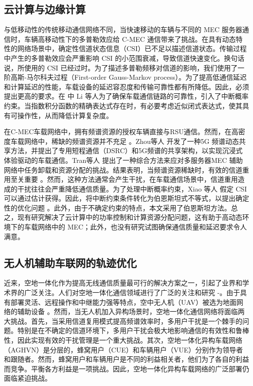\subsection{云计算与边缘计算}\label{section1-2-2}
与低移动性的传统移动通信网络不同，当快速移动的车辆与不同的 MEC 服务器通信时，车辆高移动性下的多普勒效应给 C-MEC 通信带来了挑战。在具有动态特性的网络场景中，确定性信道状态信息（CSI）已不足以描述信道状态。传输过程中产生的多普勒效应会严重影响 CSI 的小范围衰减，导致信道快速变化。换句话说，所使用的 CSI 已经过时。为了描述多普勒频移对信道的影响，我们使用了一阶高斯-马尔科夫过程（First-order Gauss-Markov process）\cite{CCO}。为了提高低通信延迟和计算延迟的性能，车载设备的延迟容忍度和传输可靠性都有所降低。因此，必须提出更高的要求。在 \cite{Li2020} 中 Li 等人为了确保车载通信链路的可靠性，引入了中断概率约束。当指数积分函数的精确表达式存在时，有必要考虑近似闭式表达式，使其具有可操作性，从而降低计算复杂度。

在C-MEC车载网络中，拥有频谱资源的授权车辆直接与RSU通信。然而，在高密度车载网络中，稀缺的频谱资源并不充足 \cite{Xie2020}。Zhou等人 \cite{Zhou2017} 开发了一种5G 频谱动态共享方法，并提出了专用短程通信（DSRC）和5G频谱的共享架构，以实现沉浸式体验驱动的车载通信。Tran等人 \cite{Tran2019} 提出了一种综合方法来应对多服务器MEC 辅助网络中任务卸载和资源分配的挑战。结果表明，当频谱资源稀缺时，有效的信道重用至关重要 \cite{Liang2021}。然而，这种方法通常会产生干扰，在车载通信场景中，信道重用造成的干扰往往会严重降低通信质量。为了处理中断概率约束，Xiao 等人  \cite{Xiao2020} 假定 CSI 可以通过估计获得。因此，将中断约束条件转化为伯恩斯坦式不等式，以提出确定性的优化问题 \cite{Chen2022}。此外，由于不确定约束的特点，本文采用了伯恩斯坦方法。总之，现有研究解决了云计算中的功率控制和计算资源分配问题，这有助于高动态环境下的车载网络中的 MEC；此外，也没有研究试图确保通信质量和延迟要求令人满意。
\subsection{无人机辅助车联网的轨迹优化}\label{section1-2-3}
近来，空地一体化作为提高无线通信质量最可行的解决方案之一，引起了业界和学术界的广泛关注。人们对空地一体化通信领域进行了广泛的关注和研究 \cite{OUC}-\cite{SDR}。由于具有部署灵活、远程操作和中继能力强等特点，空中无人机（UAV）被选为地面网络的辅助设备 \cite{ACO} \cite{田秋来}。然而，当无人机加入异构场景时，空地一体化通信网络将面临两大挑战。首先，当采用信道复用模式提高频谱效率时，多用户干扰是一个棘手的问题。特别是在不确定的信道环境下，多用户干扰会极大地影响通信的有效性和鲁棒性，因此实现有效的干扰管理是一个重大挑战。其次，空地一体化异构车载网络（AGHVN）是分层的，蜂窝用户（CUE）和车辆用户（VUE）分别作为领导者和跟随者。然而，蜂窝用户和车辆用户是不同的利益相关者，他们为了各自的利益而竞争。平衡各方利益是一项挑战。因此，空地一体化异构车载网络的广泛部署仍面临紧迫挑战。

